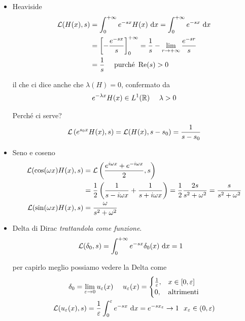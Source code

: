 \begin{itemize}
\item Heaviside
\begin{align*}
\mathcal{L}(H(x), s) & = \int^{+ \infty}_{0} e^{- sx} H(x) \  \mathrm{d} x = \int^{+ \infty}_{0} e^{- sx} \  \mathrm{d} x\\
 & = \left[ - \frac{e^{- sx}}{s}\right]^{+ \infty}_{0} = \frac{1}{s} - \lim_{r\rightarrow + \infty}\frac{e^{- sr}}{s}\\
 & = \frac{1}{s} \ \ \ \ \text{purché} \ \operatorname{Re} (s) > 0
\end{align*}

il che ci dice anche che $\lambda (H) = 0$, confermato da
\begin{equation*}
e^{- \lambda x} H(x) \in L^{1}(\mathbb{R}) \ \ \ \ \lambda > 0
\end{equation*}

Perché ci serve?
\begin{equation*}
\mathcal{L}\left(e^{s_{0} x} H(x), s\right) = \mathcal{L}(H(x), s - s_{0}) = \frac{1}{s - s_{0}}
\end{equation*}
\item Seno e coseno
\begin{align*}
\mathcal{L}(\cos(\omega x) H(x), s) & = \mathcal{L}\left(\frac{e^{i\omega x} + e^{- i\omega x}}{2}, s\right)\\
 & = \frac{1}{2}\left(\frac{1}{s - i\omega x} + \frac{1}{s + i\omega x}\right) = \frac{1}{2}\frac{2s}{s^{2} + \omega^{2}} = \frac{s}{s^{2} + \omega^{2}}\\
\mathcal{L}(\sin(\omega x) H(x), s) & = \frac{\omega}{s^{2} + \omega^{2}}
\end{align*}
\item Delta di Dirac \textit{trattandola come funzione}.
\begin{align*}
\mathcal{L}(\delta_{0}, s) & = \int^{+ \infty}_{0} e^{- sx} \delta_{0}(x) \  \mathrm{d} x = 1
\end{align*}

per capirlo meglio possiamo vedere la Delta come
\begin{gather*}
\delta_{0} = \lim\limits_{\varepsilon \rightarrow 0} u_{\varepsilon}(x) \ \ \ \ u_{\varepsilon}(x) =
\begin{cases}
\frac{1}{\varepsilon}, & x\in [0, \varepsilon]\\
0, & \text{altrimenti}
\end{cases}\\
\mathcal{L}(u_{\varepsilon}(x), s) = \frac{1}{\varepsilon}\int^{\varepsilon}_{0} e^{- sx} \  \mathrm{d} x = e^{- sx_{\varepsilon}}\rightarrow 1\ \ x_{\varepsilon} \in (0, \varepsilon)
\end{gather*}
\end{itemize}

